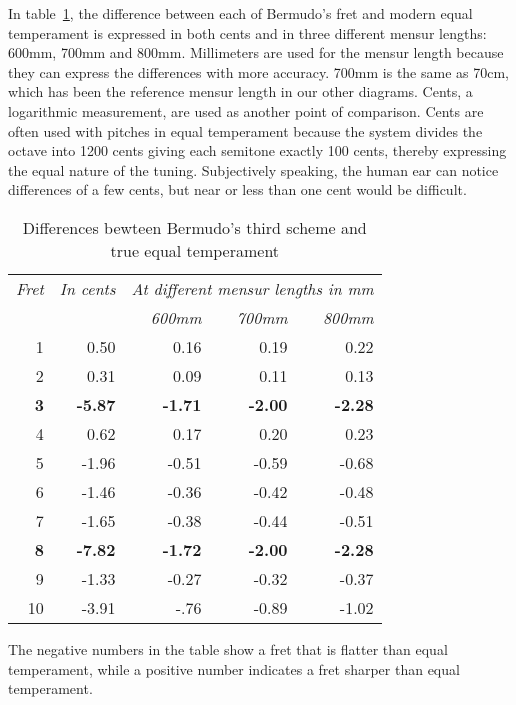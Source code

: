 In table~\ref{bermudo:differences}, the difference between each of Bermudo's fret and
modern equal temperament is expressed in both cents and in three different mensur
lengths: 600mm, 700mm and 800mm.  Millimeters are used for the mensur length because they
can express the differences with more accuracy.  700mm is the same as 70cm, which
has been the reference mensur length in our other diagrams. Cents, a logarithmic
measurement, are used as another point of comparison.  Cents are often used with
pitches in equal temperament because the system divides the octave into 1200 cents giving
each semitone exactly 100 cents, thereby expressing the equal nature of the tuning.
Subjectively speaking, the human ear can notice differences of a few cents, but near or
less than one cent would be difficult.
\begin{table}[h!]
    \begin{center}
    \begin{tabular}{ r r| r r r }
      \textit{Fret} & \textit{In cents} & \multicolumn{3}{c}{\textit{At different mensur lengths in mm}} \\
       &  & \textit{600mm} & \textit{700mm} & \textit{800mm} \\
      \hline
              1  &          0.50	&          0.16	 &          0.19  &          0.22  \\
              2  &          0.31	&          0.09	 &          0.11  &          0.13  \\
      \textbf{3} & \textbf{-5.87}	& \textbf{-1.71} & \textbf{-2.00} & \textbf{-2.28} \\
              4  &          0.62	&          0.17	 &          0.20  &          0.23  \\
              5  &         -1.96	&         -0.51	 &         -0.59  &         -0.68  \\
              6  &         -1.46	&         -0.36	 &         -0.42  &         -0.48  \\
              7  &         -1.65	&         -0.38	 &         -0.44  &         -0.51  \\
      \textbf{8} & \textbf{-7.82}	& \textbf{-1.72} & \textbf{-2.00} & \textbf{-2.28} \\
              9  &         -1.33	&         -0.27	 &         -0.32  &         -0.37  \\
              10 &         -3.91	&         -.76	 &         -0.89  &         -1.02  \\
    \end{tabular}
    \end{center}
    \caption{Differences bewteen Bermudo's third scheme and true equal temperament}
    \label{bermudo:differences}
\end{table}
The negative numbers in the table show a fret that is flatter than equal temperament,
while a positive number indicates a fret sharper than equal temperament.

